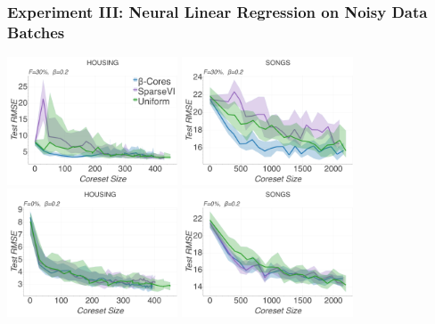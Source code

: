 \documentclass[hyperref={colorlinks = true},unknownkeysallowed]{beamer}
\begin{document}
\begin{frame}
	\frametitle{Experiment III: Neural Linear Regression on Noisy Data Batches}
	\centering
	\includegraphics[width=.49\textwidth, height=3.8cm]{figs/boston02_01_30_RMSEvssz.png}
	\includegraphics[width=.49\textwidth, height=3.8cm]{figs/year02_01_30_RMSEvssz.png}
	\includegraphics[width=.49\textwidth, height=3.8cm]{figs/boston02_01_0_RMSEvssz.png}
	\includegraphics[width=.49\textwidth, height=3.8cm]{figs/year02_01_0_RMSEvssz.png}
\end{frame}
\end{document}
